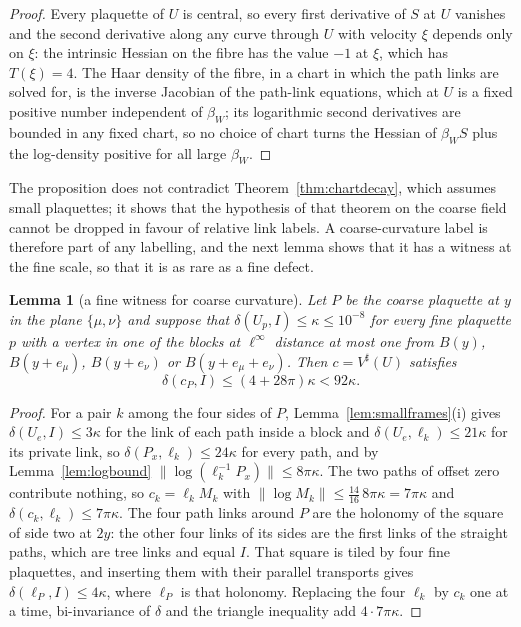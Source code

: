 \documentclass[11pt]{amsart}
\newtheorem{lemma}[theorem]{Lemma}
\theoremstyle{definition}
\theoremstyle{remark}
\numberwithin{equation}{section}
\begin{document}
\begin{proof}
Every plaquette of $U$ is central, so every first derivative of $S$ at $U$
vanishes and the second derivative along any curve through $U$ with
velocity $\xi$ depends only on $\xi$: the intrinsic Hessian on the fibre
has the value $-1$ at $\xi$, which has $T(\xi)=4$. The Haar density of the
fibre, in a chart in which the path links are solved for, is the inverse
Jacobian of the path-link equations, which at $U$ is a fixed positive
number independent of $\beta_W$; its logarithmic second derivatives are
bounded in any fixed chart, so no choice of chart turns the Hessian of
$\beta_WS$ plus the log-density positive for all large $\beta_W$.
\end{proof}

The proposition does not contradict Theorem~\ref{thm:chartdecay}, which
assumes small plaquettes; it shows that the hypothesis of that theorem on
the coarse field cannot be dropped in favour of relative link labels. A
coarse-curvature label is therefore part of any labelling, and the next
lemma shows that it has a witness at the fine scale, so that it is as rare
as a fine defect.

\begin{lemma}[a fine witness for coarse curvature]\label{lem:coarsewitness}
Let $P$ be the coarse plaquette at $y$ in the plane $\{\mu,\nu\}$ and
suppose that $\delta(U_p,I)\le\kappa\le10^{-8}$ for every fine plaquette
$p$ with a vertex in one of the blocks at $\ell^\infty$ distance at most
one from $B(y)$, $B(y+e_\mu)$, $B(y+e_\nu)$ or $B(y+e_\mu+e_\nu)$. Then
$c=V^\sharp(U)$ satisfies
\[
\delta(c_P,I)\le(4+28\pi)\kappa<92\kappa .
\]
\end{lemma}

\begin{proof}
For a pair $k$ among the four sides of $P$, Lemma~\ref{lem:smallframes}(i)
gives $\delta(U_e,I)\le3\kappa$ for the link of each path inside a block
and $\delta(U_e,\ell_k)\le21\kappa$ for its private link, so $\delta(P_x,
\ell_k)\le24\kappa$ for every path, and by Lemma~\ref{lem:logbound}
$\lVert\log(\ell_k^{-1}P_x)\rVert\le8\pi\kappa$. The two paths of offset
zero contribute nothing, so $c_k=\ell_kM_k$ with $\lVert\log M_k\rVert\le
\frac{14}{16}\,8\pi\kappa=7\pi\kappa$ and $\delta(c_k,\ell_k)\le7\pi\kappa$.
The four path links around $P$ are the holonomy of the square of side two
at $2y$: the other four links of its sides are the first links of the
straight paths, which are tree links and equal $I$. That square is tiled
by four fine plaquettes, and inserting them with their parallel transports
gives $\delta(\ell_P,I)\le4\kappa$, where $\ell_P$ is that holonomy. Replacing
the four $\ell_k$ by $c_k$ one at a time, bi-invariance of $\delta$ and the
triangle inequality add $4\cdot7\pi\kappa$.
\end{proof}
\end{document}
